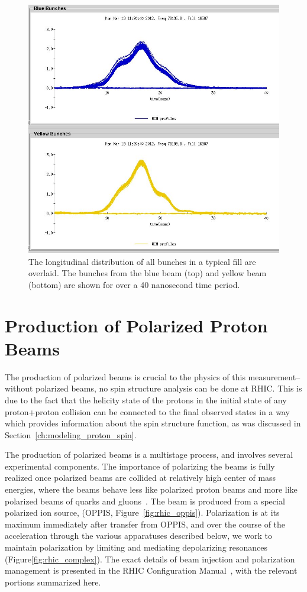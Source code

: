 \begin{figure}
  \centering
  \includegraphics[width=0.7\linewidth]{./figures/wcm_16587.jpeg}
  \caption{
		The longitudinal distribution of all bunches in a typical fill are overlaid.
		The bunches from the blue beam (top) and yellow beam (bottom) are shown for
		over a 40 nanosecond time period. 
  }
  \label{fig:bunch_profile_overlay}
\end{figure}

\clearpage
\section{Production of Polarized Proton Beams}

The production of polarized beams is crucial to the physics of this
measurement--without polarized beams, no spin structure analysis can be done at
RHIC. This is due to the fact that the helicity state of the protons in the
initial state of any proton+proton collision can be connected to the final
observed states in a way which provides information about the spin structure
function, as was discussed in Section~\ref{ch:modeling_proton_spin}. 

The production of polarized beams is a multistage process, and involves several
experimental components. The importance of polarizing the beams is fully
realized once polarized beams are collided at relatively high center of mass
energies, where the beams behave less like polarized proton beams and more like
polarized beams of quarks and gluons~\cite{Alekseev2003}. The beam is produced
from a special polarized ion source, (OPPIS, Figure~\ref{fig:rhic_oppis}).
Polarization is at its maximum immediately after transfer from OPPIS, and over
the course of the acceleration through the various apparatuses described below,
we work to maintain polarization by limiting and mediating depolarizing
resonances (Figure\ref{fig:rhic_complex}). The exact details of beam injection
and polarization management is presented in the RHIC Configuration
Manual~\cite{RHIC2006}, with the relevant portions summarized here.

